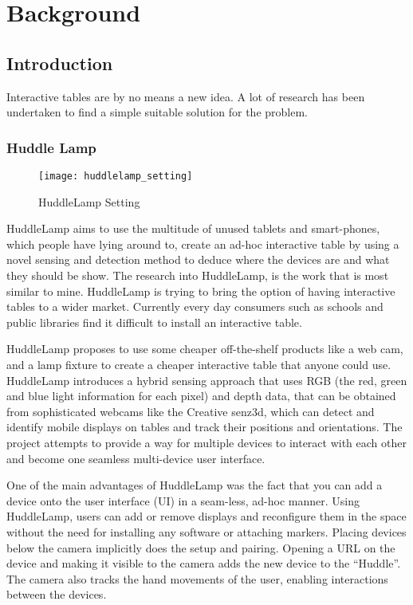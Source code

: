 
\chapter{Background}

\label{ch:background}

\section{Introduction} 

Interactive tables are by no means a new idea. A lot of research has
been undertaken to find a simple suitable solution for the problem.

\subsection{Huddle Lamp} \label{Sec:huddlelamp}
\begin{figure}[H]
\centering
\texttt{[image: huddlelamp\_setting]}
\protect\caption{HuddleLamp Setting}
\end{figure}
HuddleLamp aims to use the multitude of unused tablets and smart-phones,
which people have lying around to, create an ad-hoc interactive table
by using a novel sensing and detection method to deduce where the
devices are and what they should be show. The research into HuddleLamp\cite{huddle-link}, is the work that
is most similar to mine. HuddleLamp is trying to bring the option of having interactive tables to a wider market. Currently every day consumers such as schools and public libraries find it difficult to install an interactive table.


HuddleLamp\cite{huddlelamp-paper} proposes to use some cheaper
off-the-shelf products like a web cam, and a lamp fixture to create a cheaper
interactive table that anyone could use. HuddleLamp\cite{huddlelamp-paper} introduces a hybrid sensing approach that uses RGB (the red, green and blue light information for each pixel) and depth data, that can be obtained from sophisticated webcams like the Creative senz3d\cite{creative-senz3d}, which can detect and identify mobile displays on tables and track their positions and orientations. The project attempts to provide a way for multiple devices to interact with each other and become one seamless multi-device user interface.

One of the main advantages of HuddleLamp was the fact that you can add a device onto the user interface (UI) in a seam-less, ad-hoc manner. Using HuddleLamp,
users can add or remove displays and reconfigure them in the space without
the need for installing any software or attaching markers. Placing
devices below the camera implicitly does the setup and pairing.
Opening a URL on the device and making it visible to the camera adds
the new device to the \textquotedblleft Huddle\textquotedblright .
The camera also tracks the hand movements of the user, enabling interactions
between the devices.

